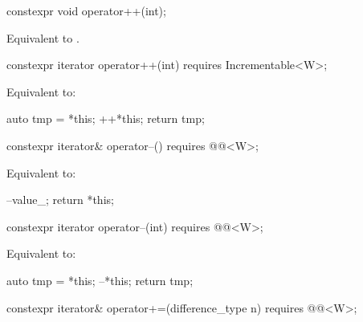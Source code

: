 \begin{itemdecl}
constexpr void operator++(int);
\end{itemdecl}

\begin{itemdescr}
\pnum
\effects Equivalent to .
\end{itemdescr}

\begin{itemdecl}
constexpr iterator operator++(int) requires Incrementable<W>;
\end{itemdecl}

\begin{itemdescr}
\pnum
\effects Equivalent to:
\begin{codeblock}
auto tmp = *this;
++*this;
return tmp;
\end{codeblock}
\end{itemdescr}

\begin{itemdecl}
constexpr iterator& operator--() requires @@<W>;
\end{itemdecl}

\begin{itemdescr}
\pnum
\effects Equivalent to:
\begin{codeblock}
--value_;
return *this;
\end{codeblock}
\end{itemdescr}

\begin{itemdecl}
constexpr iterator operator--(int) requires @@<W>;
\end{itemdecl}

\begin{itemdescr}
\pnum
\effects Equivalent to:
\begin{codeblock}
auto tmp = *this;
--*this;
return tmp;
\end{codeblock}
\end{itemdescr}

\begin{itemdecl}
constexpr iterator& operator+=(difference_type n)
  requires @@<W>;
\end{itemdecl}

